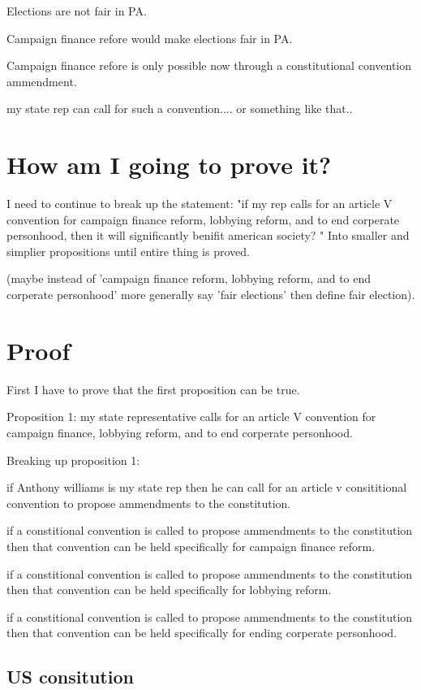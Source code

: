 \documentclass[11pt]{article} %
\begin{document}
\begin{enumerate}
Elections are not fair in PA.

Campaign finance refore would make elections fair in PA. 

Campaign finance refore is only possible now through a constitutional convention ammendment. 

my state rep can call for such a convention.... or something like that.. 

\section{How am I going to prove it?}

I need to continue to break up the statement: "if my rep calls for an article V convention for campaign finance reform, lobbying reform, and to end corperate personhood,  then it will significantly benifit american society? " Into smaller and simplier propositions until entire thing is proved.

(maybe instead of 'campaign finance reform, lobbying reform, and to end corperate personhood' more generally say 'fair elections' then define fair election). 

\section{Proof}

First I have to prove that the first proposition can be true.

Proposition 1: my state representative calls for an article V convention for campaign finance, lobbying reform, and to end corperate personhood.

Breaking up proposition 1:

if Anthony williams is my state rep then he can call for an article v consititional convention to propose ammendments to the constitution.

if a constitional convention is called to propose ammendments to the constitution then that convention can be held specifically for campaign finance reform.

if a constitional convention is called to propose ammendments to the constitution then that convention can be held specifically for lobbying reform.

if a constitional convention is called to propose ammendments to the constitution then that convention can be held specifically for ending corperate personhood.

\subsection{US consitution}


\end{enumerate}
\end{document}
